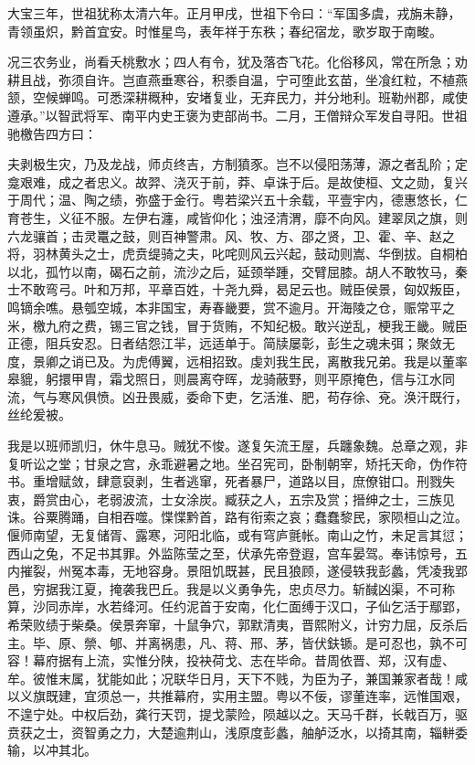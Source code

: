 \documentclass[12pt,UTF8]{ctexbook}
\begin{document}
大宝三年，世祖犹称太清六年。正月甲戌，世祖下令曰：“军国多虞，戎旃未静，青领虽炽，黔首宜安。时惟星鸟，表年祥于东秩；春纪宿龙，歌岁取于南畯。

况三农务业，尚看夭桃敷水；四人有令，犹及落杏飞花。化俗移风，常在所急；劝耕且战，弥须自许。岂直燕垂寒谷，积黍自温，宁可堕此玄苗，坐飡红粒，不植燕颔，空候蝉鸣。可悉深耕穊种，安堵复业，无弃民力，并分地利。班勒州郡，咸使遵承。”以智武将军、南平内史王褒为吏部尚书。二月，王僧辩众军发自寻阳。世祖驰檄告四方曰：

夫剥极生灾，乃及龙战，师贞终吉，方制獖豕。岂不以侵阳荡薄，源之者乱阶；定龛艰难，成之者忠义。故羿、浇灭于前，莽、卓诛于后。是故使桓、文之勋，复兴于周代；温、陶之绩，弥盛于金行。粤若梁兴五十余载，平壹宇内，德惠悠长，仁育苍生，义征不服。左伊右瀍，咸皆仰化；浊泾清渭，靡不向风。建翠凤之旗，则六龙骧首；击灵鼍之鼓，则百神警肃。风、牧、方、邵之贤，卫、霍、辛、赵之将，羽林黄头之士，虎贲缇骑之夫，叱咤则风云兴起，鼓动则嵩、华倒拔。自桐柏以北，孤竹以南，碣石之前，流沙之后，延颈举踵，交臂屈膝。胡人不敢牧马，秦士不敢弯弓。叶和万邦，平章百姓，十尧九舜，曷足云也。贼臣侯景，匈奴叛臣，鸣镝余噍。悬瓠空城，本非国宝，寿春畿要，赏不逾月。开海陵之仓，赈常平之米，檄九府之费，锡三官之钱，冒于货贿，不知纪极。敢兴逆乱，梗我王畿。贼臣正德，阻兵安忍。日者结怨江羋，远适单于。简牍屡彰，彭生之魂未弭；聚敛无度，景卿之诮已及。为虎傅翼，远相招致。虔刘我生民，离散我兄弟。我是以董率皋貔，躬擐甲胄，霜戈照日，则晨离夺晖，龙骑蔽野，则平原掩色，信与江水同流，气与寒风俱愤。凶丑畏威，委命下吏，乞活淮、肥，苟存徐、兗。涣汗既行，丝纶爰被。

我是以班师凯归，休牛息马。贼犹不悛。遂复矢流王屋，兵躔象魏。总章之观，非复听讼之堂；甘泉之宫，永乖避暑之地。坐召宪司，卧制朝宰，矫托天命，伪作符书。重增赋敛，肆意裒剥，生者逃窜，死者暴尸，道路以目，庶僚钳口。刑戮失衷，爵赏由心，老弱波流，士女涂炭。臧获之人，五宗及赏；搢绅之士，三族见诛。谷粟腾踊，自相吞噬。惵惵黔首，路有衔索之哀；蠢蠢黎民，家陨桓山之泣。偃师南望，无复储胥、露寒，河阳北临，或有穹庐氈帐。南山之竹，未足言其愆；西山之兔，不足书其罪。外监陈莹之至，伏承先帝登遐，宫车晏驾。奉讳惊号，五内摧裂，州冤本毒，无地容身。景阻饥既甚，民且狼顾，遂侵轶我彭蠡，凭凌我郢邑，穷据我江夏，掩袭我巴丘。我是以义勇争先，忠贞尽力。斩馘凶渠，不可称算，沙同赤岸，水若绛河。任约泥首于安南，化仁面缚于汉口，子仙乞活于鄢郢，希荣败绩于柴桑。侯景奔窜，十鼠争穴，郭默清夷，晋熙附义，计穷力屈，反杀后主。毕、原、禜、郇、并离祸患，凡、蒋、邢、茅，皆伏鈇锧。是可忍也，孰不可容！幕府据有上流，实惟分陕，投袂荷戈、志在毕命。昔周依晋、郑，汉有虚、牟。彼惟末属，犹能如此；况联华日月，天下不贱，为臣为子，兼国兼家者哉！咸以义旗既建，宜须总一，共推幕府，实用主盟。粤以不佞，谬董连率，远惟国艰，不遑宁处。中权后劲，龚行天罚，提戈蒙险，陨越以之。天马千群，长戟百万，驱贲获之士，资智勇之力，大楚逾荆山，浅原度彭蠡，舳舻泛水，以掎其南，辎軿委输，以冲其北。
\end{document}
